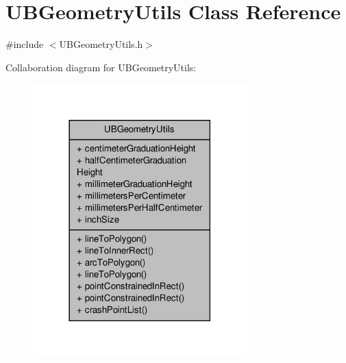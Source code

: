 \hypertarget{class_u_b_geometry_utils}{\section{U\-B\-Geometry\-Utils Class Reference}
\label{d3/dff/class_u_b_geometry_utils}
}


{\ttfamily \#include $<$U\-B\-Geometry\-Utils.\-h$>$}



Collaboration diagram for U\-B\-Geometry\-Utils\-:
\nopagebreak
\begin{figure}[H]
\begin{center}
\leavevmode
\includegraphics[width=234pt]{d8/d81/class_u_b_geometry_utils__coll__graph}
\end{center}
\end{figure}
